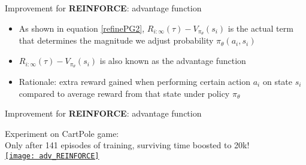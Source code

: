 \begin{frame}{Improvement for \textbf{REINFORCE}: advantage function}
    \begin{itemize}
    \item As shown in equation \ref{refinePG2}, $R_{i:\infty}(\tau)-V_{\pi_\theta}(s_i)$ is the actual term that determines the magnitude we adjust probability $\pi_{\theta}(a_i,s_i)$\vspace{0.3cm}
    \item $R_{i:\infty}(\tau)-V_{\pi_\theta}(s_i)$ is also known as the advantage function \vspace{0.3cm}
    \item Rationale: extra reward gained when performing certain action $a_i$ on state $s_i$ compared to average reward from that state under policy $\pi_{\theta}$\vspace{0.3cm}
    \end{itemize}
\end{frame}

\begin{frame}{Improvement for \textbf{REINFORCE}: advantage function}
    \vspace{0.2cm}
    \begin{center}Experiment on CartPole game:\\Only after 141 episodes of training, surviving time boosted to 20k! \\\href{https://youtu.be/6EdXsW5A1iU}{\texttt{[image: adv\_REINFORCE]}}\end{center}
\end{frame}

